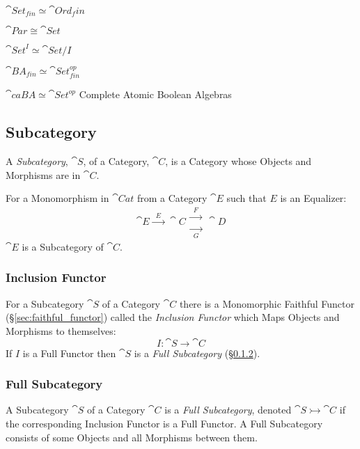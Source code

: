 $\cat{Set}_{fin} \simeq \cat{Ord}_fin$

$\cat{Par} \cong \cat{Set}$

$\cat{Set}^I \simeq \cat{Set}/I$

$\cat{BA}_{fin} \simeq \cat{Set}_{fin}^{op}$

$\cat{caBA} \simeq \cat{Set}^{op}$ Complete Atomic Boolean
Algebras %



\subsection{Subcategory}\label{sec:subcategory}

A \emph{Subcategory}, $\cat{S}$, of a Category, $\cat{C}$, is a
Category whose Objects and Morphisms are in $\cat{C}$.

For a Monomorphism in $\cat{Cat}$ from a Category $\cat{E}$ such
that $E$ is an Equalizer:
\[
  \cat{E} \xrightarrow{\;\;E\;\;} \cat{C}
  \begin{matrix}
  \xrightarrow{\;\;F\;\;}\\
  \xrightarrow[\;\;G\;\;]{}
  \end{matrix}
  \cat{D}
\]
$\cat{E}$ is a Subcategory of $\cat{C}$.



\subsubsection{Inclusion Functor}\label{sec:inclusion_functor}

For a Subcategory $\cat{S}$ of a Category $\cat{C}$ there is a
Monomorphic Faithful Functor (\S\ref{sec:faithful_functor}) called the
\emph{Inclusion Functor} which Maps Objects and Morphisms to
themselves:
\[
  I : \cat{S} \rightarrow \cat{C}
\]
If $I$ is a Full Functor then $\cat{S}$ is a \emph{Full
  Subcategory} (\S\ref{sec:full_subcategory}).



\subsubsection{Full Subcategory}\label{sec:full_subcategory}

A Subcategory $\cat{S}$ of a Category $\cat{C}$ is a \emph{Full
  Subcategory}, denoted $\cat{S} \rightarrowtail \cat{C}$ if the
corresponding Inclusion Functor is a Full Functor. A Full Subcategory
consists of some Objects and all Morphisms between them.

